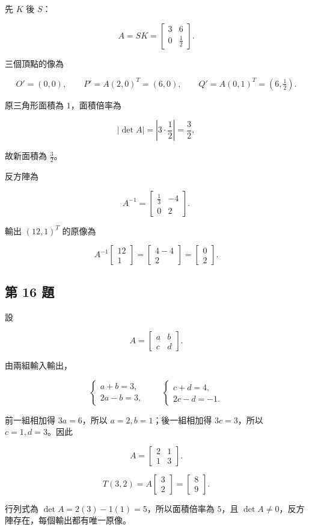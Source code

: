 \documentclass[11pt,a4paper]{article}
\begin{document}
先 \(K\) 後 \(S\)：

\[
A=SK
=
\boxed{\begin{bmatrix}3&6\\0&\tfrac12\end{bmatrix}}.
\]

三個頂點的像為

\[
O'=(0,0),\qquad
P'=A(2,0)^T=(6,0),\qquad
Q'=A(0,1)^T=\left(6,\tfrac12\right).
\]

原三角形面積為 \(1\)，面積倍率為

\[
|\det A|=\left|3\cdot\frac12\right|=\frac32,
\]

故新面積為 \(\boxed{\frac32}\)。

反方陣為

\[
A^{-1}=
\begin{bmatrix}\tfrac13&-4\\0&2\end{bmatrix}.
\]

輸出 \((12,1)^T\) 的原像為

\[
A^{-1}\begin{bmatrix}12\\1\end{bmatrix}
=
\begin{bmatrix}4-4\\2\end{bmatrix}
=\boxed{\begin{bmatrix}0\\2\end{bmatrix}}.
\]

\clearpage

\subsection{第 16 題}\label{ux7b2c-16-ux984c}

設

\[
A=\begin{bmatrix}a&b\\c&d\end{bmatrix}.
\]

由兩組輸入輸出，

\[
\begin{cases}
a+b=3,\\
2a-b=3,
\end{cases}
\qquad
\begin{cases}
c+d=4,\\
2c-d=-1.
\end{cases}
\]

前一組相加得 \(3a=6\)，所以 \(a=2,b=1\)；後一組相加得 \(3c=3\)，所以 \(c=1,d=3\)。因此

\[
\boxed{A=\begin{bmatrix}2&1\\1&3\end{bmatrix}}.
\]

\[
T(3,2)
=A\begin{bmatrix}3\\2\end{bmatrix}
=
\boxed{\begin{bmatrix}8\\9\end{bmatrix}}.
\]

行列式為 \(\det A=2(3)-1(1)=5\)，所以面積倍率為 \(\boxed{5}\)，且 \(\det A\ne0\)，反方陣存在，每個輸出都有唯一原像。
\end{document}
